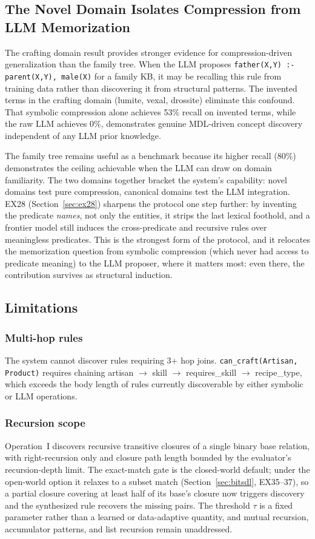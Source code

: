 \documentclass[10pt,conference]{IEEEtran}
\begin{document}
\subsection{The Novel Domain Isolates Compression from LLM Memorization}

The crafting domain result provides stronger evidence for compression-driven generalization than the family tree. When the LLM proposes \texttt{father(X,Y) :- parent(X,Y), male(X)} for a family KB, it may be recalling this rule from training data rather than discovering it from structural patterns. The invented terms in the crafting domain (lumite, vexal, drossite) eliminate this confound. That symbolic compression alone achieves 53\% recall on invented terms, while the raw LLM achieves 0\%, demonstrates genuine MDL-driven concept discovery independent of any LLM prior knowledge.

The family tree remains useful as a benchmark because its higher recall (80\%) demonstrates the ceiling achievable when the LLM can draw on domain familiarity. The two domains together bracket the system's capability: novel domains test pure compression, canonical domains test the LLM integration. EX28 (Section~\ref{sec:ex28}) sharpens the protocol one step further: by inventing the predicate \emph{names}, not only the entities, it strips the last lexical foothold, and a frontier model still induces the cross-predicate and recursive rules over meaningless predicates. This is the strongest form of the protocol, and it relocates the memorization question from symbolic compression (which never had access to predicate meaning) to the LLM proposer, where it matters most: even there, the contribution survives as structural induction.

\subsection{Limitations}

\subsubsection{Multi-hop rules} The system cannot discover rules requiring 3+ hop joins. \texttt{can\_craft(Artisan, Product)} requires chaining artisan $\to$ skill $\to$ requires\_skill $\to$ recipe\_type, which exceeds the body length of rules currently discoverable by either symbolic or LLM operations.

\subsubsection{Recursion scope} Operation~I discovers recursive transitive closures of a single binary base relation, with right-recursion only and closure path length bounded by the evaluator's recursion-depth limit. The exact-match gate is the closed-world default; under the open-world option it relaxes to a subset match (Section~\ref{sec:bitsdl}, EX35--37), so a partial closure covering at least half of its base's closure now triggers discovery and the synthesized rule recovers the missing pairs. The threshold $\tau$ is a fixed parameter rather than a learned or data-adaptive quantity, and mutual recursion, accumulator patterns, and list recursion remain unaddressed.
\end{document}
